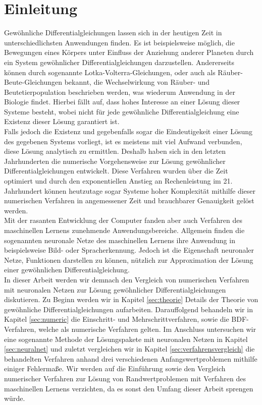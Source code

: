 \section{Einleitung}
\label{sec:einleitung}
Gewöhnliche Differentialgleichungen lassen sich in der heutigen Zeit in unterschiedlichsten Anwendungen finden.
Es ist beispielsweise möglich, die Bewegungen eines Körpers unter Einfluss der Anziehung anderer Planeten durch
ein System gewöhnlicher Differentialgleichungen darzustellen. Andererseits können durch sogenannte
Lotka-Volterra-Gleichungen, oder auch als Räuber-Beute-Gleichungen bekannt, die Wechselwirkung von Räuber- und
Beutetierpopulation beschrieben werden, was wiederum Anwendung in der Biologie findet. Hierbei fällt auf, dass hohes
Interesse an einer Lösung dieser Systeme besteht, wobei nicht für jede gewöhnliche Differentialgleichung eine Existenz
dieser Lösung garantiert ist.\\
Falls jedoch die Existenz und gegebenfalls sogar die Eindeutigekeit einer Lösung des gegebenen Systems vorliegt, ist es
meistens mit viel Aufwand verbunden, diese Lösung analytisch zu ermittlen. Deshalb haben sich in den letzten
Jahrhunderten die numerische Vorgehensweise zur Lösung gewöhnlicher Differentialgleichungen entwickelt.
Diese Verfahren wurden über die Zeit optimiert und durch den exponentiellen Anstieg an Rechenleistung im 21. Jahrhundert
können heutzutage sogar Systeme hoher Komplexität mithilfe dieser numerischen Verfahren in angemessener Zeit und
brauchbarer Genauigkeit gelöst werden. \\
Mit der rasanten Entwicklung der Computer fanden aber auch Verfahren des maschinellen Lernens zunehmende
Anwendungsbereiche. Allgemein finden die sogenannten neuronale Netze des maschinellen Lernens ihre Anwendung in
beispielsweise Bild- oder Spracherkennung. Jedoch ist die Eigenschaft neuronaler Netze, Funktionen darstellen zu können,
nützlich zur Approximation der Lösung einer gewöhnlichen Differentialgleichung. \\
In dieser Arbeit werden wir demnach den Vergleich von numerischen Verfahren mit neuronalen Netzen zur Lösung
gewöhnlicher Differentialgleichungen diskutieren. Zu Beginn werden wir in Kapitel \ref{sec:theorie} Details der
Theorie von gewöhnliche Differentialgleichungen aufarbeiten. Darauffolgend behandeln wir in Kapitel \ref{sec:numeric}
die Einschritt- und Mehrschrittverfahren, sowie die BDF-Verfahren, welche als numerische Verfahren gelten.
Im Anschluss untersuchen wir eine sogenannte Methode der Lösungspakete mit neuronalen Netzen in
Kapitel \ref{sec:neuralnet} und zuletzt vergleichen wir in Kapitel \ref{sec:verfahrensvergleich} die behandelten
Verfahren anhand drei verschiedenen Anfangswertproblemen mithilfe einiger Fehlermaße. Wir werden auf die Einführung
sowie den Vergleich numerischer Verfahren zur Lösung von Randwertproblemen mit Verfahren des maschinellen Lernens
verzichten, da es sonst den Umfang dieser Arbeit sprengen würde.
\newpage

